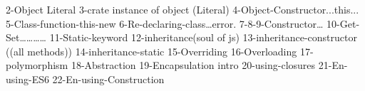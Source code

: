 2-Object Literal
3-crate instance of object (Literal)
4-Object-Constructor...this...
5-Class-function-this-new
6-Re-declaring-class…error.
7-8-9-Constructor…
10-Get-Set…………
11-Static-keyword
12-inheritance(soul of js)
13-inheritance-constructor ((all methods))
14-inheritance-static
15-Overriding
16-Overloading
17-polymorphism
18-Abstraction
19-Encapsulation intro
20-using-closures
21-En-using-ES6
22-En-using-Construction
